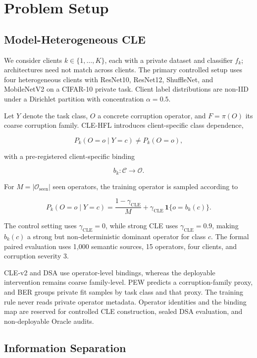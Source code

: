 \section{Problem Setup}

\subsection{Model-Heterogeneous CLE}

We consider clients \(k\in\{1,\ldots,K\}\), each with a private dataset and classifier \(f_k\); architectures need not match across clients. The primary controlled setup uses four heterogeneous clients with ResNet10, ResNet12, ShuffleNet, and MobileNetV2 on a CIFAR-10 private task. Client label distributions are non-IID under a Dirichlet partition with concentration \(\alpha=0.5\).

Let \(Y\) denote the task class, \(O\) a concrete corruption operator, and \(F=\pi(O)\) its coarse corruption family. CLE-HFL introduces client-specific class dependence,

\[
P_k(O=o\mid Y=c)\neq P_k(O=o),
\]

with a pre-registered client-specific binding

\[
b_k:\mathcal C\rightarrow\mathcal O.
\]

For \(M=|\mathcal O_{\mathrm{seen}}|\) seen operators, the training operator is sampled according to

\[
P_k(O=o\mid Y=c)
=\frac{1-\gamma_{\mathrm{CLE}}}{M}
+\gamma_{\mathrm{CLE}}\,\mathbf 1\{o=b_k(c)\}.
\]

The control setting uses \(\gamma_{\mathrm{CLE}}=0\), while strong CLE uses \(\gamma_{\mathrm{CLE}}=0.9\), making \(b_k(c)\) a strong but non-deterministic dominant operator for class \(c\). The formal paired evaluation uses 1,000 semantic sources, 15 operators, four clients, and corruption severity 3.

CLE-v2 and DSA use operator-level bindings, whereas the deployable intervention remains coarse family-level. PEW predicts a corruption-family proxy, and BER groups private fit samples by task class and that proxy. The training rule never reads private operator metadata. Operator identities and the binding map are reserved for controlled CLE construction, sealed DSA evaluation, and non-deployable Oracle audits.

\subsection{Information Separation}

